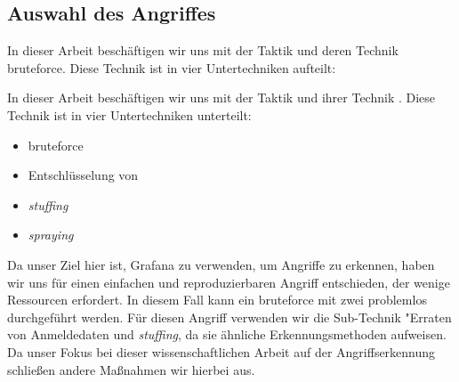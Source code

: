 
\newpage
\subsection{Auswahl des Angriffes}
In dieser Arbeit beschäftigen wir uns mit der Taktik  und deren Technik \gls{bruteforce}. Diese Technik ist in vier Untertechniken aufteilt:

In dieser Arbeit beschäftigen wir uns mit der Taktik  und ihrer Technik . Diese Technik ist in vier Untertechniken unterteilt:

{
\begin{itemize}[noitemsep]
   \item \gls{bruteforce}
   \item	Entschlüsselung von 
   \item \textit{\gls{stuffing}}
   \item \textit{\gls{spraying}}
\end{itemize}
}

Da unser Ziel hier ist, Grafana zu verwenden, um Angriffe zu erkennen, haben wir uns für einen einfachen und reproduzierbaren Angriff entschieden, der wenige Ressourcen erfordert. In diesem Fall kann ein \gls{bruteforce} mit zwei  problemlos durchgeführt werden. Für diesen Angriff verwenden wir die Sub-Technik "Erraten von Anmeldedaten und \textit{\gls{stuffing}}, da sie ähnliche Erkennungsmethoden aufweisen. Da unser Fokus bei dieser wissenschaftlichen Arbeit auf der Angriffserkennung schließen andere Maßnahmen  wir hierbei aus.

